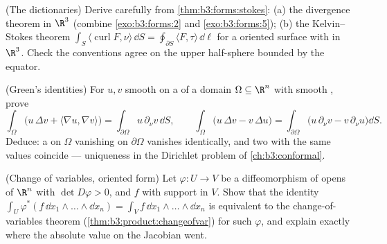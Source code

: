 \begin{exercise}[$\star\star$]\label{exo:b3:forms:7}
(The dictionaries) Derive carefully from
\cref{thm:b3:forms:stokes}: (a) the divergence theorem in
$\R^3$ (combine \cref{exo:b3:forms:2} and
\cref{exo:b3:forms:5}); (b) the Kelvin--Stokes theorem
$\int_S\langle\operatorname{curl}F, \nu\rangle\,\dd S =
\oint_{\partial S}\langle F, \tau\rangle\,\dd\ell$ for a
 oriented surface with  in $\R^3$. Check the
 conventions agree on the upper half-sphere
bounded by the equator.
\end{exercise}

\begin{exercise}[$\star\star$]\label{exo:b3:forms:8}
(Green's identities) For $u, v$ smooth on a  of
a  domain $\Omega \subseteq \R^n$ with smooth
, prove
\[
\int_\Omega\bigl(u\,\Delta v + \langle\nabla u, \nabla
v\rangle\bigr) = \int_{\partial\Omega}u\,\partial_\nu
v\,\dd S,
\qquad
\int_\Omega\bigl(u\,\Delta v - v\,\Delta u\bigr) =
\int_{\partial\Omega}\bigl(u\,\partial_\nu v -
v\,\partial_\nu u\bigr)\dd S .
\]
Deduce: a  on $\Omega$ vanishing on
$\partial\Omega$ vanishes identically, and two  with the same  values coincide ---
uniqueness in the Dirichlet problem of
\cref{ch:b3:conformal}.
\end{exercise}

\begin{exercise}[$\star\star$]\label{exo:b3:forms:9}
(Change of variables, oriented form) Let $\varphi\colon U
\to V$ be a diffeomorphism of opens of $\R^n$ with $\det
D\varphi > 0$, and $f$  with  support in
$V$. Show that the  identity
$\int_U\varphi^*(f\,\dd x_1\wedge\dots\wedge\dd x_n) =
\int_Vf\,\dd x_1\wedge\dots\wedge\dd x_n$ is equivalent to
the change-of-variables theorem
(\cref{thm:b3:product:changeofvar}) for such $\varphi$, and
explain exactly where the absolute value on the Jacobian
went.
\end{exercise}

